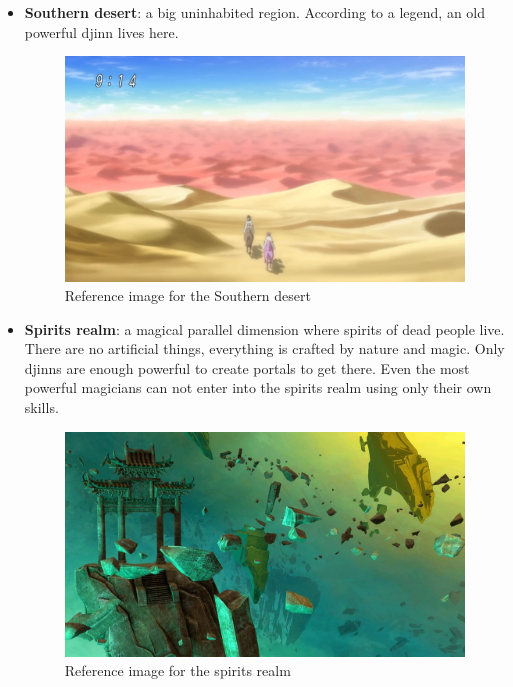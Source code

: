 \begin{itemize}
	\item \textbf{Southern desert}: a big uninhabited region. According to a legend, an old powerful djinn lives here.
	\begin{figure}[H]
	  \centering
	  \includegraphics[width=12cm]{../Images/Locations/southernDesert}
	  \caption{Reference image for the Southern desert}
	\end{figure}

	\item \textbf{Spirits realm}: a magical parallel dimension where spirits of dead people live. There are no artificial things, everything is crafted by nature and magic. Only djinns are enough powerful to create portals to get there. Even the most powerful magicians can not enter into the spirits realm using only their own skills.
	\begin{figure}[H]
	  \centering
	  \includegraphics[width=12cm]{../Images/Locations/spiritsRealm}
	  \caption{Reference image for the spirits realm}
	\end{figure}


\end{itemize}
